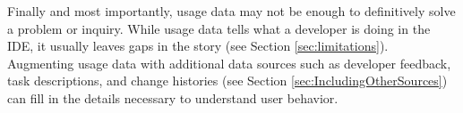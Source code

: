 Finally and most importantly, usage data may not be enough to definitively solve a problem or inquiry. While usage data tells what a developer is doing in the IDE, it usually leaves gaps in the story (see Section \ref{sec:limitations}).  Augmenting usage data with additional data sources such as developer feedback, task descriptions, and change histories (see Section \ref{sec:IncludingOtherSources}) can fill in the details necessary to understand user behavior.


